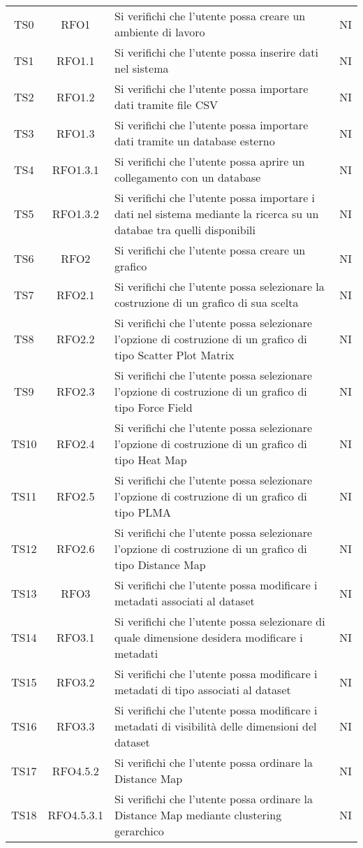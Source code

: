 \documentclass[../piano_di_qualifica.tex]{subfiles}
\begin{document}
\begin{center}
\begin{longtable}{|c|c|p{8cm}|c|}
		\endlastfoot
		TS0   & RFO1            & Si verifichi che l'utente possa creare un ambiente di lavoro     & NI                         \\
		TS1   & RFO1.1          & Si verifichi che l'utente possa inserire dati nel sistema & NI                         \\
		TS2   & RFO1.2 			& Si verifichi che l'utente possa importare dati tramite file CSV         & NI                         \\
		TS3   & RFO1.3          & Si verifichi che l'utente possa importare dati tramite un database esterno   & NI                  \\
		TS4   & RFO1.3.1      	& Si verifichi che l'utente possa aprire un collegamento con un database & NI                         \\
		TS5   & RFO1.3.2      	& Si verifichi che l'utente possa importare i dati nel sistema mediante la ricerca su un databae tra quelli disponibili & NI  \\
		TS6   & RFO2      		& Si verifichi che l'utente possa creare  un grafico & NI  \\
		TS7   & RFO2.1      	& Si verifichi che l'utente possa selezionare la costruzione di un grafico di sua scelta & NI  \\
		TS8   & RFO2.2      	& Si verifichi che l'utente possa selezionare l'opzione di costruzione di un grafico di tipo Scatter Plot Matrix & NI  \\
		TS9   & RFO2.3     		& Si verifichi che l'utente possa selezionare l'opzione di costruzione di un grafico di tipo Force Field & NI  \\
		TS10  & RFO2.4     		& Si verifichi che l'utente possa selezionare l'opzione di costruzione di un grafico di tipo Heat Map & NI  \\
		TS11  & RFO2.5     		& Si verifichi che l'utente possa selezionare l'opzione di costruzione di un grafico di tipo PLMA & NI \\
		TS12  & RFO2.6     		& Si verifichi che l'utente possa selezionare l'opzione di costruzione di un grafico di tipo Distance Map & NI \\
		TS13  & RFO3     		& Si verifichi che l'utente possa modificare i metadati associati al dataset & NI \\
		TS14  & RFO3.1     		& Si verifichi che l'utente possa selezionare di quale dimensione desidera modificare i metadati & NI \\
		TS15  & RFO3.2     		& Si verifichi che l'utente possa modificare i metadati di tipo associati al dataset & NI \\
		TS16  & RFO3.3     		& Si verifichi che l'utente possa modificare i metadati di visibilità delle dimensioni del dataset & NI \\
		TS17  & RFO4.5.2     	& Si verifichi che l'utente possa ordinare la Distance Map & NI \\
		TS18  & RFO4.5.3.1     	& Si verifichi che l'utente possa ordinare la Distance Map mediante clustering gerarchico & NI \\
		

\end{longtable}
\end{center}
\end{document}
